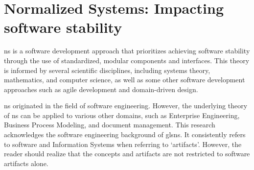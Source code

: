 \section{Normalized Systems: Impacting software stability} \label{sec:ns_theory}

\gls{ns} is a software development approach that prioritizes achieving software stability
through the use of standardized, modular components and interfaces. This theory is
informed by several scientific disciplines, including systems theory, mathematics, and
computer science, as well as some other software development approaches such as agile
development and domain-driven design.

\gls{ns} originated in the field of software engineering. However, the underlying theory
of \gls{ns} can be applied to various other domains, such as Enterprise Engineering,
Business Process Modeling, and document management. This research acknowledges the
software engineering background of gls{ns}. It consistently refers to software and
Information Systems when referring to \enquote*{artifacts}. However, the reader should
realize that the concepts and artifacts are not restricted to software artifacts alone.